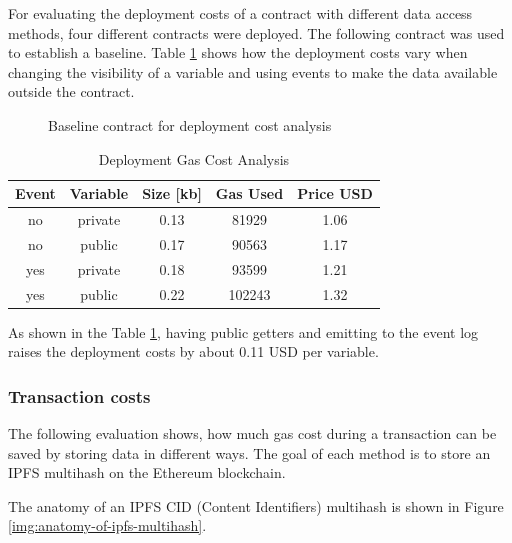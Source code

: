 For evaluating the deployment costs of a contract with different data access methods, four different contracts were deployed. The following contract was used to establish a baseline. Table \ref{tab:deployment-gas-cost-analysis} shows how the deployment costs vary when changing the visibility of a variable and using events to make the data available outside the contract.

\begin{figure}[H]
    
    \caption{Baseline contract for deployment cost analysis}
    \label{code:ipfs-storage}
\end{figure}

\begin{table}[ht]
\centering
\begin{tabular}{|c|c|c|c|c|}
\hline
\textbf{Event} & \textbf{Variable} & \textbf{Size {[}kb{]}} & \textbf{Gas Used} & \textbf{Price USD} \\ \hline
no             & private           & 0.13                   & 81929             & 1.06               \\ \hline
no             & public            & 0.17                   & 90563             & 1.17               \\ \hline
yes            & private           & 0.18                   & 93599             & 1.21               \\ \hline
yes            & public            & 0.22                   & 102243            & 1.32               \\ \hline
\end{tabular}
\caption{Deployment Gas Cost Analysis}
\label{tab:deployment-gas-cost-analysis}
\end{table}

As shown in the Table \ref{tab:deployment-gas-cost-analysis}, having public getters and emitting to the event log raises the deployment costs by about 0.11 USD per variable. 


\subsubsection{Transaction costs}\label{sec:tx-costs-evaluation}
The following evaluation shows, how much gas cost during a transaction can be saved by storing data in different ways. The goal of each method is to store an IPFS multihash on the Ethereum blockchain.

The anatomy of an IPFS CID (Content Identifiers) multihash is shown in Figure \ref{img:anatomy-of-ipfs-multihash}. 

